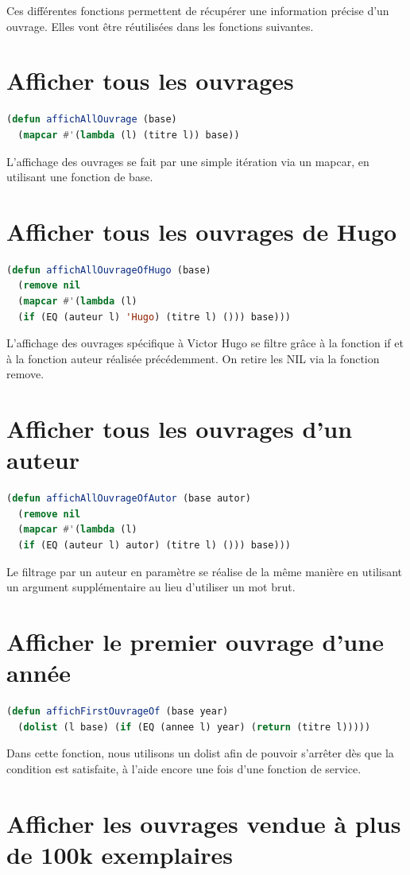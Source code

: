 \documentclass[a4paper,10pt]{report}
\begin{document}
	  Ces différentes fonctions permettent de récupérer une information précise d’un ouvrage. Elles vont être réutilisées dans les fonctions suivantes.
	  \newpage
\section{Afficher tous les ouvrages}	  
\begin{lstlisting}[language=Lisp]	  
(defun affichAllOuvrage (base)
  (mapcar #'(lambda (l) (titre l)) base))
\end{lstlisting}
L’affichage des ouvrages se fait par une simple itération via un mapcar, en utilisant une fonction de base.
\section{Afficher tous les ouvrages de Hugo}	  
\begin{lstlisting}[language=Lisp]
(defun affichAllOuvrageOfHugo (base)
  (remove nil 
  (mapcar #'(lambda (l) 
  (if (EQ (auteur l) 'Hugo) (titre l) ())) base)))
\end{lstlisting}
L’affichage des ouvrages spécifique à Victor Hugo se filtre grâce à la fonction if et à la fonction auteur réalisée précédemment. On retire les NIL via la fonction remove.
\section{Afficher tous les ouvrages d'un auteur}	  
\begin{lstlisting}[language=Lisp]
(defun affichAllOuvrageOfAutor (base autor)
  (remove nil 
  (mapcar #'(lambda (l) 
  (if (EQ (auteur l) autor) (titre l) ())) base)))
\end{lstlisting}
Le filtrage par un auteur en paramètre se réalise de la même manière en utilisant un argument supplémentaire au lieu d’utiliser un mot brut.
\section{Afficher le premier ouvrage d'une année}	  

\begin{lstlisting}[language=Lisp]
(defun affichFirstOuvrageOf (base year)
  (dolist (l base) (if (EQ (annee l) year) (return (titre l)))))
\end{lstlisting}
Dans cette fonction, nous utilisons un dolist afin de pouvoir s’arrêter dès que la condition est satisfaite, à l’aide encore une fois d’une fonction de service.
\section{Afficher les ouvrages vendue à plus de 100k exemplaires}	  
\end{document}
